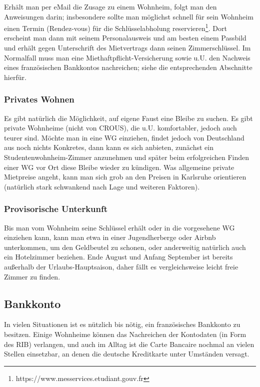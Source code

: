 \documentclass[11pt,a4paper]{article}
\begin{document}
	Erhält man per eMail die Zusage zu einem Wohnheim, folgt man den Anweisungen darin; insbesondere sollte man möglichst schnell für sein Wohnheim einen Termin (Rendez-vous) für die Schlüsselabholung reservieren\footnote{https://www.messervices.etudiant.gouv.fr}. Dort erscheint man dann mit seinem Personalausweis und am besten einem Passbild und erhält gegen Unterschrift des Mietvertrags dann seinen Zimmerschlüssel. Im Normalfall muss man eine Miethaftpflicht-Versicherung sowie u.U. den Nachweis eines französischen Bankkontos nachreichen; siehe die entsprechenden Abschnitte hierfür.
	
	\subsubsection{Privates Wohnen}
	
	Es gibt natürlich die Möglichkeit, auf eigene Faust eine Bleibe zu suchen. Es gibt private Wohnheime (nicht von CROUS), die u.U. komfortabler, jedoch auch teurer sind. Möchte man in eine WG einziehen, findet jedoch von Deutschland aus noch nichts Konkretes, dann kann es sich anbieten, zunächst ein Studentenwohnheim-Zimmer anzunehmen und später beim erfolgreichen Finden einer WG vor Ort diese Bleibe wieder zu kündigen. Was allgemeine private Mietpreise angeht, kann man sich grob an den Preisen in Karlsruhe orientieren (natürlich stark schwankend nach Lage und weiteren Faktoren).
	
	\subsubsection{Provisorische Unterkunft}
	
	Bis man vom Wohnheim seine Schlüssel erhält oder in die vorgesehene WG einziehen kann, kann man etwa in einer Jugendherberge oder Airbnb unterkommen, um den Geldbeutel zu schonen, oder anderweitig natürlich auch ein Hotelzimmer beziehen. Ende August und Anfang September ist bereits außerhalb der Urlaubs-Hauptsaison, daher fällt es vergleichsweise leicht freie Zimmer zu finden.
	
	\subsection{Bankkonto}
	
	In vielen Situationen ist es nützlich bis nötig, ein französisches Bankkonto zu besitzen. Einige Wohnheime können das Nachreichen der Kontodaten (in Form des RIB) verlangen, und auch im Alltag ist die Carte Bancaire nochmal an vielen Stellen einsetzbar, an denen die deutsche Kreditkarte unter Umständen versagt.
	
\end{document}
